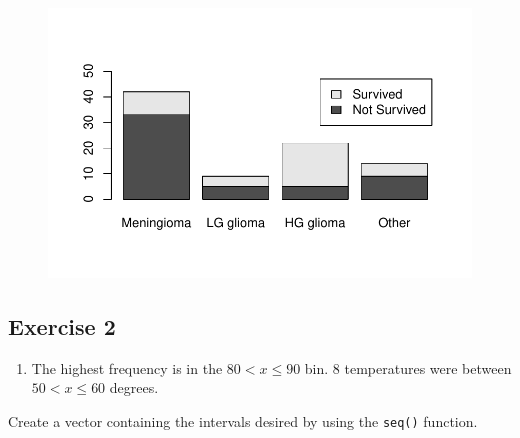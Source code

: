 \documentclass[
  letterpaper,
  DIV=11,
  numbers=noendperiod]{scrreprt}
\newenvironment{Shaded}{\begin{snugshade}}{\end{snugshade}}
\newcommand{\AttributeTok}[1]{\textcolor[rgb]{0.40,0.45,0.13}{#1}}
\newcommand{\DecValTok}[1]{\textcolor[rgb]{0.68,0.00,0.00}{#1}}
\newcommand{\FunctionTok}[1]{\textcolor[rgb]{0.28,0.35,0.67}{#1}}
\newcommand{\NormalTok}[1]{\textcolor[rgb]{0.00,0.23,0.31}{#1}}
\newcommand{\SpecialCharTok}[1]{\textcolor[rgb]{0.37,0.37,0.37}{#1}}
\newcommand{\StringTok}[1]{\textcolor[rgb]{0.13,0.47,0.30}{#1}}
\providecommand{\tightlist}{%
  \setlength{\itemsep}{0pt}\setlength{\parskip}{0pt}}\usepackage{longtable,booktabs,array}
\begin{document}
\begin{Shaded}
\end{Shaded}

\begin{figure}[H]

{\centering \includegraphics{./03-DescriptiveII_files/figure-pdf/unnamed-chunk-6-1.pdf}

}

\end{figure}

\hypertarget{exercise-2-3}{%
\subsection*{Exercise 2}\label{exercise-2-3}}

\begin{enumerate}
\def\labelenumi{\arabic{enumi}.}
\tightlist
\item
  The highest frequency is in the \(80 < x ≤ 90\) bin. \(8\)
  temperatures were between \(50 < x ≤ 60\) degrees.
\end{enumerate}

Create a vector containing the intervals desired by using the
\texttt{seq()} function.
\end{document}
